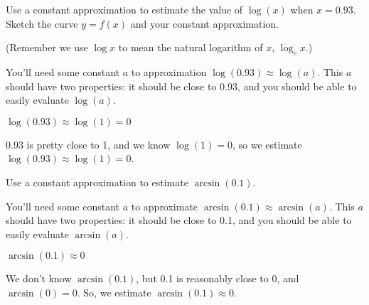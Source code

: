 
\begin{question}\label{s3.4.1startapprox}
Use a constant approximation to estimate the value of $\log(x)$ when $x=0.93$. Sketch the curve $y=f(x)$ and your constant approximation.

(Remember we use $\log x$ to mean the natural logarithm of $x$, $\log_e x$.)
\end{question}
\begin{hint}
You'll need some constant $a$ to approximation $\log(0.93) \approx \log(a)$.
This $a$ should have two properties: it should be close to 0.93, and you should be able to easily evaluate $\log(a)$.
\end{hint}
\begin{answer}
$\log(0.93)\approx \log(1)=0$
 \begin{center}\end{center}

\end{answer}
\begin{solution}
 0.93 is pretty close to 1, and we know $\log(1)=0$, so we estimate
 $\log(0.93) \approx \log(1)=0$.
 \begin{center}\end{center}
\end{solution}




\begin{Mquestion}
Use a constant approximation to estimate
$\arcsin(0.1)$.
\end{Mquestion}
\begin{hint}
You'll need some constant $a$ to approximate $\arcsin(0.1) \approx \arcsin(a)$.
This $a$ should have two properties: it should be close to 0.1, and you should be able to easily evaluate $\arcsin(a)$.
\end{hint}
\begin{answer}
$\arcsin(0.1) \approx 0$
\end{answer}
\begin{solution}
We don't know $\arcsin(0.1)$,
but 0.1 is reasonably close to 0, and
$\arcsin(0)=0$. So, we estimate
$\arcsin(0.1) \approx0$.
\end{solution}



